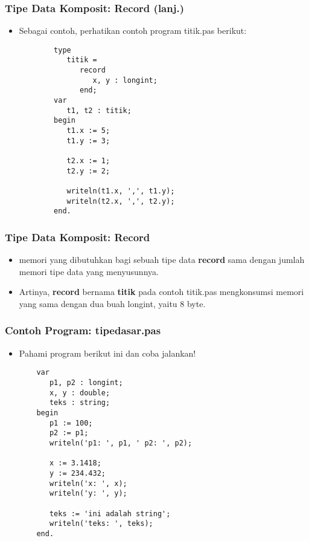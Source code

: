 \documentclass{beamer}
\begin{document}
\begin{frame}[fragile]
\frametitle{Tipe Data Komposit: Record (lanj.)}
\begin{itemize}
	\item Sebagai contoh, perhatikan contoh program titik.pas berikut:
	\begin{lstlisting}
		type
		   titik = 
		      record
		         x, y : longint;
		      end;
		var
		   t1, t2 : titik;
		begin
		   t1.x := 5;
		   t1.y := 3;
		
		   t2.x := 1;
		   t2.y := 2;
		
		   writeln(t1.x, ',', t1.y);
		   writeln(t2.x, ',', t2.y);
		end.
	\end{lstlisting}
\end{itemize}
\end{frame}

\begin{frame}
\frametitle{Tipe Data Komposit: Record}
\begin{itemize}
	\item memori yang dibutuhkan bagi sebuah tipe data \textbf{record} sama dengan jumlah memori tipe data yang menyusunnya.
	\item Artinya, \textbf{record} bernama \textbf{titik} pada contoh titik.pas mengkonsumsi memori yang sama dengan dua buah longint, yaitu 8 byte.
\end{itemize}
\end{frame}

\begin{frame}[fragile]
\frametitle{Contoh Program: tipedasar.pas}
\begin{itemize}
	\item Pahami program berikut ini dan coba jalankan!
	\begin{lstlisting}
	var
	   p1, p2 : longint;
	   x, y : double;
	   teks : string;
	begin
	   p1 := 100;
	   p2 := p1;
	   writeln('p1: ', p1, ' p2: ', p2);
	   
	   x := 3.1418;
	   y := 234.432;
	   writeln('x: ', x);
	   writeln('y: ', y);
	   
	   teks := 'ini adalah string';
	   writeln('teks: ', teks);
	end.
	\end{lstlisting}
\end{itemize}
\end{frame}
\end{document}
